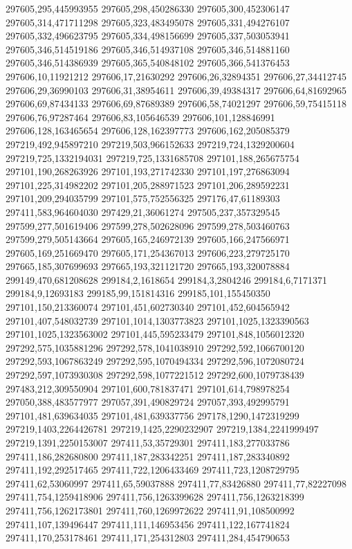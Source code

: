 297605,295,445993955
297605,298,450286330
297605,300,452306147
297605,314,471711298
297605,323,483495078
297605,331,494276107
297605,332,496623795
297605,334,498156699
297605,337,503053941
297605,346,514519186
297605,346,514937108
297605,346,514881160
297605,346,514386939
297605,365,540848102
297605,366,541376453
297606,10,11921212
297606,17,21630292
297606,26,32894351
297606,27,34412745
297606,29,36990103
297606,31,38954611
297606,39,49384317
297606,64,81692965
297606,69,87434133
297606,69,87689389
297606,58,74021297
297606,59,75415118
297606,76,97287464
297606,83,105646539
297606,101,128846991
297606,128,163465654
297606,128,162397773
297606,162,205085379
297219,492,945897210
297219,503,966152633
297219,724,1329200604
297219,725,1332194031
297219,725,1331685708
297101,188,265675754
297101,190,268263926
297101,193,271742330
297101,197,276863094
297101,225,314982202
297101,205,288971523
297101,206,289592231
297101,209,294035799
297101,575,752556325
297176,47,61189303
297411,583,964604030
297429,21,36061274
297505,237,357329545
297599,277,501619406
297599,278,502628096
297599,278,503460763
297599,279,505143664
297605,165,246972139
297605,166,247566971
297605,169,251669470
297605,171,254367013
297606,223,279725170
297665,185,307699693
297665,193,321121720
297665,193,320078884
299149,470,681208628
299184,2,1618654
299184,3,2804246
299184,6,7171371
299184,9,12693183
299185,99,151814316
299185,101,155450350
297101,150,213360074
297101,451,602730340
297101,452,604565942
297101,407,548032739
297101,1014,1303773823
297101,1025,1323390563
297101,1025,1323563002
297101,445,595233479
297101,848,1056012320
297292,575,1035881296
297292,578,1041038910
297292,592,1066700120
297292,593,1067863249
297292,595,1070494334
297292,596,1072080724
297292,597,1073930308
297292,598,1077221512
297292,600,1079738439
297483,212,309550904
297101,600,781837471
297101,614,798978254
297050,388,483577977
297057,391,490829724
297057,393,492995791
297101,481,639634035
297101,481,639337756
297178,1290,1472319299
297219,1403,2264426781
297219,1425,2290232907
297219,1384,2241999497
297219,1391,2250153007
297411,53,35729301
297411,183,277033786
297411,186,282680800
297411,187,283342251
297411,187,283340892
297411,192,292517465
297411,722,1206433469
297411,723,1208729795
297411,62,53060997
297411,65,59037888
297411,77,83426880
297411,77,82227098
297411,754,1259418906
297411,756,1263399628
297411,756,1263218399
297411,756,1262173801
297411,760,1269972622
297411,91,108500992
297411,107,139496447
297411,111,146953456
297411,122,167741824
297411,170,253178461
297411,171,254312803
297411,284,454790653
